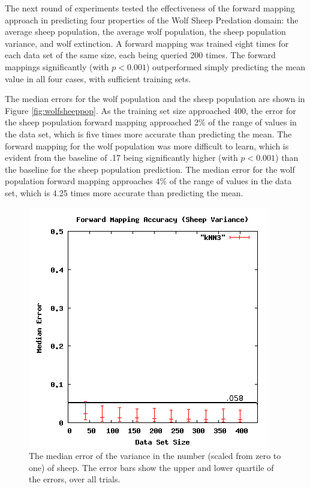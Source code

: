 The next round of experiments tested the effectiveness of the forward mapping approach in predicting four properties of the Wolf Sheep Predation domain: the average sheep population, the average wolf population, the sheep population variance, and wolf extinction.
A forward mapping was trained eight times for each data set of the same size, each being queried 200 times.
The forward mappings significantly (with $p < 0.001$) outperformed simply predicting the mean value in all four cases, with sufficient training sets.

The median errors for the wolf population and the sheep population are shown in Figure \ref{fig:wolfsheeppop}.
As the training set size approached 400, the error for the sheep population forward mapping approached 2\% of the range of values in the data set, which is five times more accurate than predicting the mean.
The forward mapping for the wolf population was more difficult to learn, which is evident from the baseline of .17 being significantly higher (with $p < 0.001$) than the baseline for the sheep population prediction.
The median error for the wolf population forward mapping approaches 4\% of the range of values in the data set, which is 4.25 times more accurate than predicting the mean.

\begin{figure}[ht]
\centering
\includegraphics[scale=.5]{images/results_wolfsheep/fm-sheep-var.png}
\caption{The median error of the variance in the number (scaled from zero to one) of sheep.
The error bars show the upper and lower quartile of the errors, over all trials.}
\label{fig:wolfsheepvar}
\end{figure}

